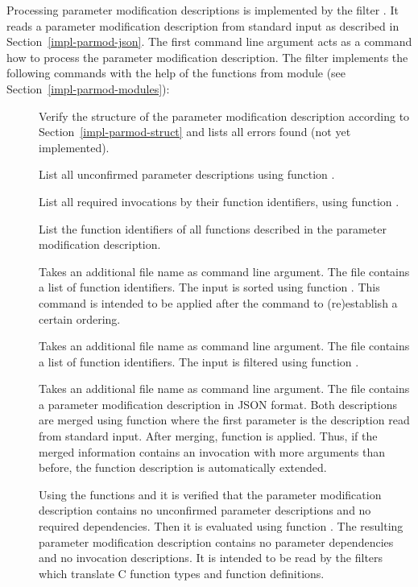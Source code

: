 Processing parameter modification descriptions is implemented by the filter . It reads a parameter
modification description from standard input as described in Section~\ref{impl-parmod-json}. The first command line 
argument acts as a command how to process the parameter modification description. The filter implements the following
commands with the help of the functions from module   (see Section~\ref{impl-parmod-modules}):
\begin{description}

\item[]
Verify the structure of the parameter modification description 
according to Section~\ref{impl-parmod-struct} and lists all errors found (not yet implemented).

\item[] 
List all unconfirmed parameter descriptions using function .

\item[]
List all required invocations by their function identifiers, using function .

\item[]
List the function identifiers of all functions described in the parameter modification description.

\item[]
Takes an additional file name as command line argument. The file contains a list of function identifiers.
The input is sorted using function . This command
is intended to be applied after the  command to (re)establish a certain ordering.

\item[]
Takes an additional file name as command line argument. The file contains a list of function identifiers.
The input is filtered using function .

\item[]
Takes an additional file name as command line argument. The file contains a parameter modification description 
in JSON format. Both descriptions are merged using function 
where the first parameter is the description read from standard input.
After merging, function  is applied.
Thus, if the merged information contains
an invocation with more arguments than before, the function description is automatically extended.

\item[]
Using the functions  and  it is verified that the parameter modification 
description contains no
unconfirmed parameter descriptions and no required dependencies. Then it is evaluated using function .
The resulting parameter modification description contains no parameter dependencies and
no invocation descriptions. It is intended to be read by the filters which translate C function types and function 
definitions.
\end{description}

